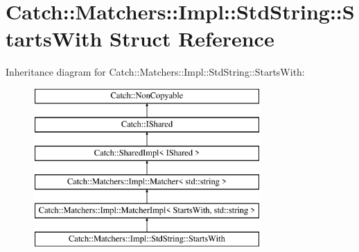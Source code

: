 \hypertarget{structCatch_1_1Matchers_1_1Impl_1_1StdString_1_1StartsWith}{}\section{Catch\+:\+:Matchers\+:\+:Impl\+:\+:Std\+String\+:\+:Starts\+With Struct Reference}
\label{structCatch_1_1Matchers_1_1Impl_1_1StdString_1_1StartsWith}
Inheritance diagram for Catch\+:\+:Matchers\+:\+:Impl\+:\+:Std\+String\+:\+:Starts\+With\+:\begin{figure}[H]
\begin{center}
\leavevmode
\includegraphics[height=6.000000cm]{structCatch_1_1Matchers_1_1Impl_1_1StdString_1_1StartsWith}
\end{center}
\end{figure}
